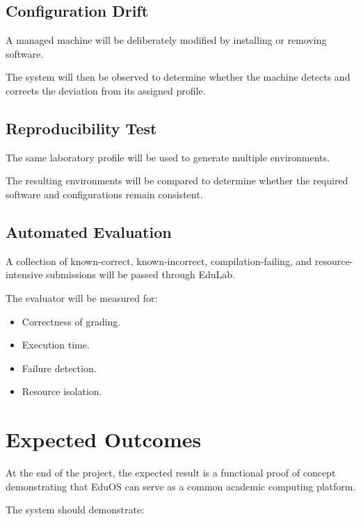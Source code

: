 \documentclass[12pt,a4paper]{article}
\begin{document}
\subsection{Configuration Drift}

A managed machine will be deliberately modified by installing or removing software.

The system will then be observed to determine whether the machine detects and corrects the deviation from its assigned profile.

\subsection{Reproducibility Test}

The same laboratory profile will be used to generate multiple environments.

The resulting environments will be compared to determine whether the required software and configurations remain consistent.

\subsection{Automated Evaluation}

A collection of known-correct, known-incorrect, compilation-failing, and resource-intensive submissions will be passed through EduLab.

The evaluator will be measured for:

\begin{itemize}
    \item Correctness of grading.
    \item Execution time.
    \item Failure detection.
    \item Resource isolation.
\end{itemize}

\section{Expected Outcomes}

At the end of the project, the expected result is a functional proof of concept demonstrating that EduOS can serve as a common academic computing platform.

The system should demonstrate:
\end{document}
